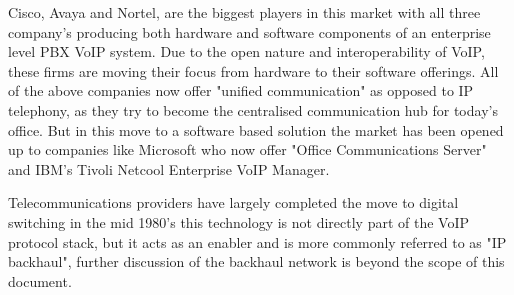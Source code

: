Cisco, Avaya and Nortel, are the biggest players in this market with all three company's producing both hardware and software components of an enterprise level PBX VoIP system. Due to the open nature and interoperability of VoIP, these firms are moving their focus from hardware to their software offerings. All of the above companies now offer "unified communication" as opposed to IP telephony, as they try to become the centralised communication hub for today's office. But in this move to a software based solution the market has been opened up to companies like Microsoft who now offer "Office Communications Server"\cite{website:microsoft_enter_uc} and IBM’s Tivoli Netcool Enterprise VoIP Manager.

Telecommunications providers have largely completed the move to digital switching in the mid 1980’s\cite{TelecommsSaN05}  this technology is not directly part of the VoIP protocol stack, but it acts as an enabler and is more commonly referred to as "IP backhaul", further discussion of the backhaul network is beyond the scope of this document.
